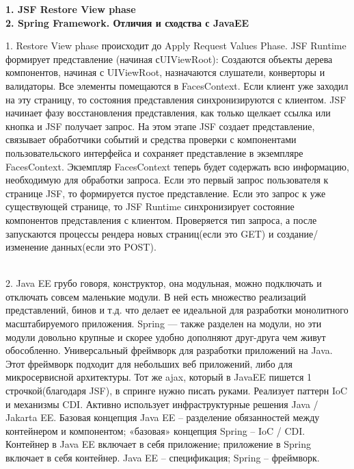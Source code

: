 \documentclass{article}
\newcommand{\bil}[4]{%
    \begin{minipage}{.3\textwidth}
        \textbf{1. #1} \\
        \textbf{2. #2}

        1. #3
        \\
        2. #4
    \end{minipage}
}
\begin{document}
\bil{JSF Restore View phase}{Spring Framework. Отличия и сходства с JavaEE}{
    Restore View phase происходит до Apply Request Values Phase.
    JSF Runtime формирует представление (начиная сUIViewRoot): 
    Создаются объекты дерева компонентов, начиная с UIViewRoot, назначаются слушатели, конверторы и валидаторы. Все элементы помещаются в FacesContext. Если клиент уже заходил на эту страницу, то состояния представления синхронизируются с клиентом.
    JSF начинает фазу восстановления представления, как только щелкает ссылка или кнопка и JSF получает запрос. На этом этапе JSF создает представление, связывает обработчики событий и средства проверки с компонентами пользовательского интерфейса и сохраняет представление в экземпляре FacesContext. Экземпляр FacesContext теперь будет содержать всю информацию, необходимую для обработки запроса.
    Если это первый запрос пользователя к странице JSF, то формируется пустое представление.
    Если это запрос к уже существующей странице, то JSF Runtime синхронизирует состояние компонентов представления с клиентом.
    Проверяется тип запроса, а после запускаются процессы рендера новых страниц(если это GET) и создание/изменение данных(если это POST).
}{
    Java EE грубо говоря, конструктор, она модульная, можно подключать и отключать совсем маленькие модули. 
    В ней есть множество реализаций представлений, бинов и т.д. что делает ее идеальной для разработки монолитного масштабируемого приложения.
    Spring — также разделен на модули, но эти модули довольно крупные и скорее удобно дополняют друг-друга чем живут обособленно.
    Универсальный фреймворк для разработки приложений на Java.
    Этот фреймворк подходит для небольших веб приложений, либо для микросервисной архитектуры. Тот же ajax, который в JavaEE пишется 1 строчкой(благодаря JSF), в спринге нужно писать руками.
    Реализует паттерн IoC и механизмы CDI.
    Активно использует инфраструктурные решения Java / Jakarta EE.
    Базовая концепция Java EE – разделение обязанностей между контейнером и компонентом; «базовая» концепция Spring – IoC / CDI.
    Контейнер в Java EE включает в себя приложение; приложение в Spring включает в себя контейнер.
    Java EE – спецификация; Spring – фреймворк.
}
\\
\end{document}
